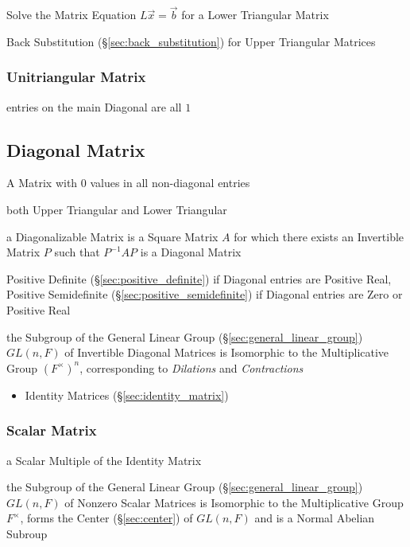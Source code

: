 Solve the Matrix Equation $L\vec{x} = \vec{b}$ for a Lower Triangular Matrix

\fist Back Substitution (\S\ref{sec:back_substitution}) for Upper Triangular
Matrices



\subsubsection{Unitriangular Matrix}\label{sec:unitriangular_matrix}

entries on the main Diagonal are all $1$



\subsection{Diagonal Matrix}\label{sec:diagonal_matrix}

A Matrix with $0$ values in all non-diagonal entries

both Upper Triangular and Lower Triangular

a Diagonalizable Matrix is a Square Matrix $A$ for which there exists an
Invertible Matrix $P$ such that $P^{-1}AP$ is a Diagonal Matrix

Positive Definite (\S\ref{sec:positive_definite}) if Diagonal entries are
Positive Real, Positive Semidefinite (\S\ref{sec:positive_semidefinite}) if
Diagonal entries are Zero or Positive Real

the Subgroup of the General Linear Group (\S\ref{sec:general_linear_group})
$GL(n,F)$ of Invertible Diagonal Matrices is Isomorphic to the Multiplicative
Group $(F^\times)^n$, corresponding to \emph{Dilations} and \emph{Contractions}

\begin{itemize}
  \item Identity Matrices (\S\ref{sec:identity_matrix})
\end{itemize}



\subsubsection{Scalar Matrix}\label{sec:scalar_matrix}

a Scalar Multiple of the Identity Matrix

the Subgroup of the General Linear Group (\S\ref{sec:general_linear_group})
$GL(n,F)$ of Nonzero Scalar Matrices is Isomorphic to the Multiplicative Group
$F^\times$, forms the Center (\S\ref{sec:center}) of $GL(n,F)$ and is a Normal
Abelian Subroup

